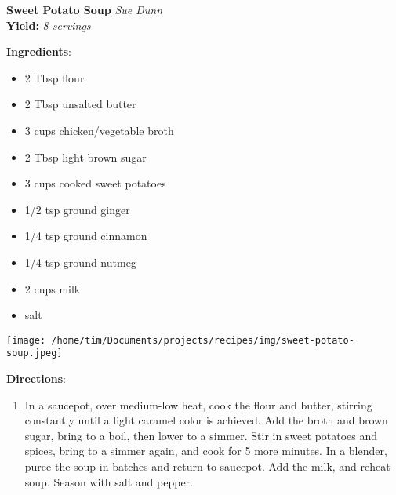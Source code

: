 \documentclass[11pt, twoside, openany]{book}
\begin{document}
\noindent\begin{minipage}[t]{\linewidth}%
{\Large\textbf{Sweet Potato Soup}} \label{sweet-potato-soup}\hfill\textit{Sue Dunn}\\
\textbf{Yield:} \textit{8 servings}\\
\noindent\begin{minipage}[t]{0.78\linewidth}%
\textbf{Ingredients}:\vspace{-3mm}
\begin{multicols}{2}
\begin{itemize}\setlength\itemsep{-1mm}
\item 2 Tbsp flour
\item 2 Tbsp unsalted butter
\item 3 cups chicken/vegetable broth
\item 2 Tbsp light brown sugar
\item 3 cups cooked sweet potatoes
\item 1/2 tsp ground ginger
\item 1/4 tsp ground cinnamon
\item 1/4 tsp ground nutmeg
\item 2 cups milk
\item salt
\end{itemize}
\end{multicols}
\end{minipage}
\noindent\begin{minipage}[t]{0.18\linewidth}
\centering \strut\vspace*{-\baselineskip}\newline
\texttt{[image: /home/tim/Documents/projects/recipes/img/sweet-potato-soup.jpeg]}\\
\end{minipage}\vspace{3mm}
\textbf{Directions}:
\vspace{-3mm}\begin{enumerate}\setlength\itemsep{-1mm}
\item In a saucepot, over medium-low heat, cook the flour and butter, stirring constantly until a light caramel color is achieved. Add the broth and brown sugar, bring to a boil, then lower to a simmer. Stir in sweet potatoes and spices, bring to a simmer again, and cook for 5 more minutes. In a blender, puree the soup in batches and return to saucepot. Add the milk, and reheat soup. Season with salt and pepper.
\end{enumerate}
\end{minipage}\vspace{8mm}
\end{document}
